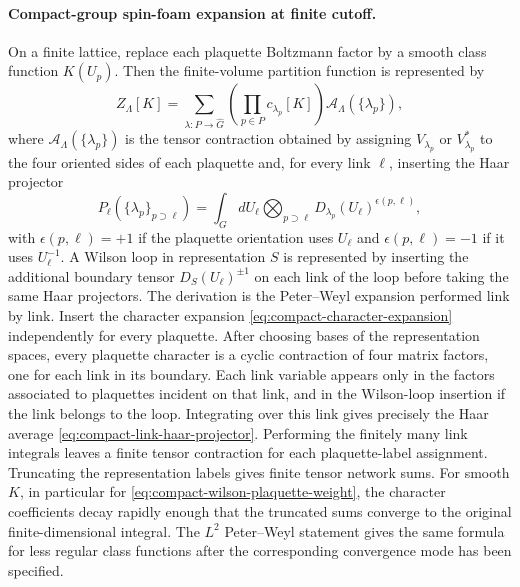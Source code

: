 \paragraph{Compact-group spin-foam expansion at finite cutoff.}
On a finite lattice, replace each plaquette Boltzmann factor by a smooth
class function \(K(U_p)\).  Then the finite-volume partition function is
represented by
\begin{equation}
  Z_\Lambda[K]
  =
  \sum_{\lambda:P\to\widehat G}
  \left(\prod_{p\in P}c_{\lambda_p}[K]\right)
  \mathcal A_\Lambda(\{\lambda_p\}),
  \label{eq:compact-spin-foam-partition}
\end{equation}
where \(\mathcal A_\Lambda(\{\lambda_p\})\) is the tensor contraction
obtained by assigning \(V_{\lambda_p}\) or \(V_{\lambda_p}^*\) to the four
oriented sides of each plaquette and, for every link \(\ell\), inserting
the Haar projector
\begin{equation}
  P_\ell(\{\lambda_p\}_{p\supset\ell})
  =
  \int_G dU_\ell
  \bigotimes_{p\supset\ell}
  D_{\lambda_p}(U_\ell)^{\epsilon(p,\ell)} ,
  \label{eq:compact-link-haar-projector}
\end{equation}
with \(\epsilon(p,\ell)=+1\) if the plaquette orientation uses \(U_\ell\)
and \(\epsilon(p,\ell)=-1\) if it uses \(U_\ell^{-1}\).  A Wilson loop in
representation \(S\) is represented by inserting the additional boundary
tensor \(D_S(U_\ell)^{\pm1}\) on each link of the loop before taking the
same Haar projectors.
The derivation is the Peter--Weyl expansion performed link by link.  Insert
the character expansion \eqref{eq:compact-character-expansion} independently
for every plaquette.  After choosing bases of the representation spaces,
every plaquette character is a cyclic contraction of four matrix factors, one
for each link in its boundary.  Each link variable appears only in the factors
associated to plaquettes incident on that link, and in the Wilson-loop
insertion if the link belongs to the loop.  Integrating over this link gives
precisely the Haar average
\eqref{eq:compact-link-haar-projector}.  Performing the finitely many link
integrals leaves a finite tensor contraction for each plaquette-label
assignment.  Truncating the representation labels gives finite tensor
network sums.  For smooth \(K\), in particular for
\eqref{eq:compact-wilson-plaquette-weight}, the character coefficients
decay rapidly enough that the truncated sums converge to the original
finite-dimensional integral.  The \(L^2\) Peter--Weyl statement gives the
same formula for less regular class functions after the corresponding
convergence mode has been specified.

